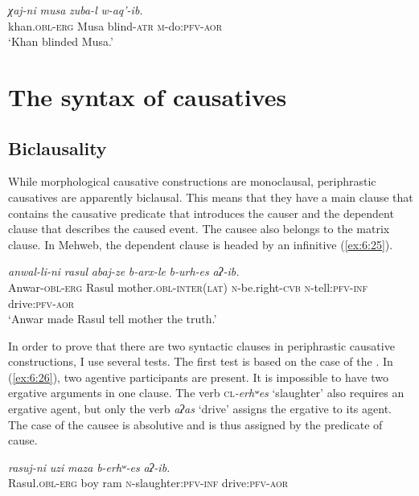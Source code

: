 ﻿\documentclass[output=paper]{langsci/langscibook}
\begin{document}
\ex %
\gll *\emph{χaj-ni} \emph{musa} \emph{zuba-l}  \emph{w-aq'-ib.}\\
khan.\textsc{obl}-\textsc{erg} Musa blind-\textsc{atr} \textsc{m}-do:\textsc{pfv}-\textsc{aor}\\
\glt  `Khan blinded Musa.'
\z
\z

\removelastskip
{}


\section{The syntax of causatives}\label{The-syntax-of-causatives}

\subsection{Biclausality}

While morphological causative constructions are monoclausal,
periphrastic causatives are apparently biclausal. This means that they
have a main clause that contains the causative predicate that introduces
the causer and the dependent clause that describes the caused event. The
causee also belongs to the matrix clause. In Mehweb, the dependent
clause is headed by an infinitive (\ref{ex:6:25}).

\ea \label{ex:6:25} %
\gll \emph{anwal-li-ni} \emph{rasul} \emph{abaj-ze} \emph{b-arx-le} \emph{b-urh-es} \emph{{aʔ-ib}.}\\
Anwar-\textsc{obl}-\textsc{erg} Rasul mother.\textsc{obl}-\textsc{inter}(\textsc{lat}) \textsc{n}-be.right-\textsc{cvb} \textsc{n}-tell:\textsc{pfv}-\textsc{inf} drive:\textsc{pfv}-\textsc{aor}    \\
\glt `Anwar made Rasul tell mother the truth.'
\z

In order to prove that there are two syntactic clauses in periphrastic
causative constructions, I use several tests. The first test is based on
the case of the . In (\ref{ex:6:26}), two agentive participants are present.
It is impossible to have two ergative arguments in one clause. The verb
\textsc{cl}\emph{-erhʷes} `slaughter' also requires an ergative agent,
but only the verb \emph{aʔas} `drive' assigns the ergative to its agent.
The case of the causee is absolutive and is thus assigned by the
predicate of cause.

\ea \label{ex:6:26} %
\ea %
\gll \emph{rasuj-ni} \emph{uzi} \emph{maza} \emph{b-erhʷ-es} \emph{aʔ-ib.}\\
Rasul.\textsc{obl}-\textsc{erg} boy ram \textsc{n}-slaughter:\textsc{pfv}-\textsc{inf} drive:\textsc{pfv}-\textsc{aor}\\
\end{document}
